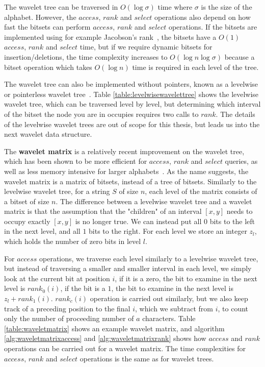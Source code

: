 The wavelet tree can be traversed in $O(\log \sigma)$ time where $\sigma$ is the size of
the alphabet. However, the $access$, $rank$ and $select$ operations also depend on how
fast the bitsets can perform $access$, $rank$ and $select$ operations. If the bitsets are
implemented using for example Jacobson's rank~\cite{JacobsonsRank}, the bitsets have a
$O(1)$ $access$, $rank$ and $select$ time, but if we require dynamic bitsets for
insertion/deletions, the time complexity increases to $O(\log n \log \sigma)$ because a
bitset operation which takes $O(\log n)$ time is required in each level of the tree.

The wavelet tree can also be implemented without pointers, known as a levelwise or
pointerless wavelet tree~\cite{LevelwiseWaveletTree}. Table \ref{table:levelwisewavelettree}
shows the levelwise wavelet tree, which can be traversed level by level, but determining
which interval of the bitset the node you are in occupies requires two calls to $rank$.
The details of the levelwise wavelet trees are out of scope for this thesis, but leads us
into the next wavelet data structure.

The \textbf{wavelet matrix} is a relatively recent improvement on the wavelet tree, which
has been shown to be more efficient for $access$, $rank$ and $select$ queries, as well as
less memory intensive for larger alphabets~\cite{WaveletMatrix}. As the name suggests, the
wavelet matrix is a matrix of bitsets, instead of a tree of bitsets. Similarly to the
levelwise wavelet tree, for a string $S$ of size $n$, each level of the matrix consists of
a bitset of size $n$. The difference between a levelwise wavelet tree and a wavelet matrix
is that the assumption that the "children" of an interval $[x, y]$ needs to occupy exactly
$[x, y]$ is no longer true. We can instead put all $0$ bits to the left in the next level,
and all $1$ bits to the right. For each level we store an integer $z_l$, which holds the
number of zero bits in level $l$. 

For $access$ operations, we traverse each level similarly to a levelwise wavelet tree, but
instead of traversing a smaller and smaller interval in each level, we simply look at the
current bit at position $i$, if it is a zero, the bit to examine in the next level is
$rank_0(i)$, if the bit is a $1$, the bit to examine in the next level is $z_l +
rank_1(i)$. $rank_c(i)$ operation is carried out similarly, but we also keep track of a
preceding position to the final $i$, which we subtract from $i$, to count only the number
of proceeding number of $a$ characters. Table \ref{table:waveletmatrix} shows an example
wavelet matrix, and algorithm \ref{alg:waveletmatrixaccess} and
\ref{alg:waveletmatrixrank} shows how $access$ and $rank$ operations can be carried out
for a wavelet matrix. The time complexities for $access$, $rank$ and $select$ operations
is the same as for wavelet trees.

